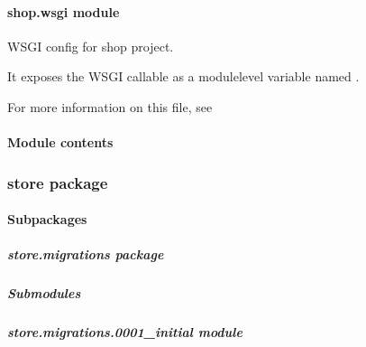 \documentclass[letterpaper,10pt,english]{sphinxmanual}
\begin{document}
\paragraph{shop.wsgi module}
\label{\detokenize{shop:module-shop.wsgi}}\label{\detokenize{shop:shop-wsgi-module}}
\sphinxAtStartPar
WSGI config for shop project.

\sphinxAtStartPar
It exposes the WSGI callable as a module\sphinxhyphen{}level variable named .

\sphinxAtStartPar
For more information on this file, see


\paragraph{Module contents}
\label{\detokenize{shop:module-shop}}\label{\detokenize{shop:module-contents}}
\sphinxstepscope


\subsubsection{store package}
\label{\detokenize{store:store-package}}\label{\detokenize{store::doc}}

\paragraph{Subpackages}
\label{\detokenize{store:subpackages}}
\sphinxstepscope


\subparagraph{store.migrations package}
\label{\detokenize{store.migrations:store-migrations-package}}\label{\detokenize{store.migrations::doc}}

\subparagraph{Submodules}
\label{\detokenize{store.migrations:submodules}}

\subparagraph{store.migrations.0001\_initial module}
\label{\detokenize{store.migrations:module-store.migrations.0001_initial}}\label{\detokenize{store.migrations:store-migrations-0001-initial-module}}
\end{document}
